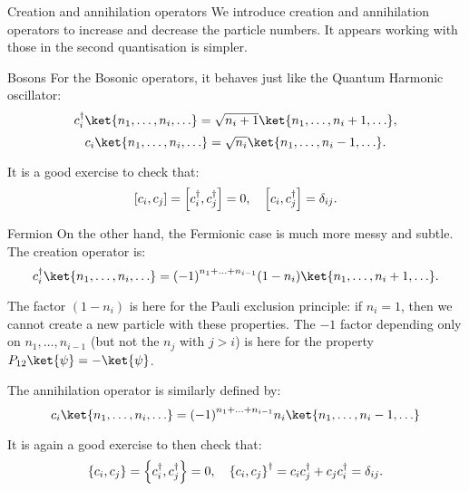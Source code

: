 \documentclass[a4paper]{article}
\begin{document}
\begin{parag}{Creation and annihilation operators}
    We introduce creation and annihilation operators to increase and decrease the particle numbers. It appears working with those in the second quantisation is simpler.

    \begin{subparag}{Bosons}
        For the Bosonic operators, it behaves just like the Quantum Harmonic oscillator: 
        \[c_i^{\dagger} \ket{n_1, \ldots, n_i, \ldots} = \sqrt{n_i + 1}\ket{n_1, \ldots, n_i + 1, \ldots},\]
        \[c_i \ket{n_1, \ldots, n_i, \ldots} = \sqrt{n_i} \ket{n_1, \ldots, n_i - 1, \ldots}.\]

        It is a good exercise to check that: 
        \[\left[c_i, c_j\right] = \left[c_i^{\dagger}, c_j^{\dagger}\right] = 0, \mathspace \left[c_i, c_j^{\dagger}\right] = \delta_{ij}.\]

    \end{subparag}

    \begin{subparag}{Fermion}
        On the other hand, the Fermionic case is much more messy and subtle. The creation operator is: 
        \[c_i^{\dagger} \ket{n_1, \ldots, n_i, \ldots} = \left(-1\right)^{n_1 + \ldots + n_{i-1}} \left(1 - n_i\right) \ket{n_1, \ldots, n_{i}+1, \ldots}.\]

        The factor $\left(1 - n_i\right)$ is here for the Pauli exclusion principle: if $n_i = 1$, then we cannot create a new particle with these properties. The $-1$ factor depending only on $n_1, \ldots, n_{i-1}$ (but not the $n_j$ with $j > i$) is here for the property $P_{12} \ket{\psi} = -\ket{\psi}$.

        The annihilation operator is similarly defined by: 
        \[c_i \ket{n_1, \ldots, n_i, \ldots} = \left(-1\right)^{n_1 + \ldots + n_{i-1}} n_i \ket{n_1, \ldots, n_i-1, \ldots}\]

        It is again a good exercise to then check that: 
        \[\left\{c_i, c_j\right\} = \left\{c_i^{\dagger}, c_j^{\dagger}\right\} = 0, \mathspace \left\{c_i, c_j\right\}^{\dagger} = c_i c_j^{\dagger} + c_j c_i^{\dagger} = \delta_{ij}.\]
        
    \end{subparag}
\end{parag}
\end{document}
